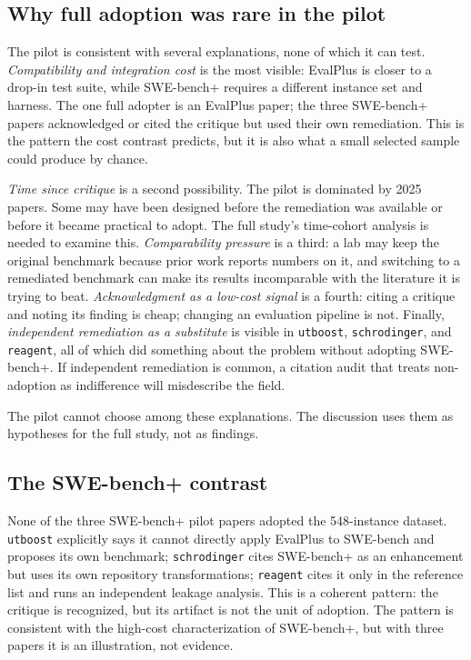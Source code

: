 \documentclass[11pt,a4paper]{article}
\newcommand{\key}[1]{\texttt{\small #1}}
\begin{document}
\subsection{Why full adoption was rare in the pilot}

The pilot is consistent with several explanations, none of which it can test. \emph{Compatibility and integration cost} is the most visible: EvalPlus is closer to a drop-in test suite, while SWE-bench+ requires a different instance set and harness. The one full adopter is an EvalPlus paper; the three SWE-bench+ papers acknowledged or cited the critique but used their own remediation. This is the pattern the cost contrast predicts, but it is also what a small selected sample could produce by chance.

\emph{Time since critique} is a second possibility. The pilot is dominated by 2025 papers. Some may have been designed before the remediation was available or before it became practical to adopt. The full study's time-cohort analysis is needed to examine this. \emph{Comparability pressure} is a third: a lab may keep the original benchmark because prior work reports numbers on it, and switching to a remediated benchmark can make its results incomparable with the literature it is trying to beat. \emph{Acknowledgment as a low-cost signal} is a fourth: citing a critique and noting its finding is cheap; changing an evaluation pipeline is not. Finally, \emph{independent remediation as a substitute} is visible in \key{utboost}, \key{schrodinger}, and \key{reagent}, all of which did something about the problem without adopting SWE-bench+. If independent remediation is common, a citation audit that treats non-adoption as indifference will misdescribe the field.

The pilot cannot choose among these explanations. The discussion uses them as hypotheses for the full study, not as findings.

\subsection{The SWE-bench+ contrast}

None of the three SWE-bench+ pilot papers adopted the 548-instance dataset. \key{utboost} explicitly says it cannot directly apply EvalPlus to SWE-bench and proposes its own benchmark; \key{schrodinger} cites SWE-bench+ as an enhancement but uses its own repository transformations; \key{reagent} cites it only in the reference list and runs an independent leakage analysis. This is a coherent pattern: the critique is recognized, but its artifact is not the unit of adoption. The pattern is consistent with the high-cost characterization of SWE-bench+, but with three papers it is an illustration, not evidence.
\end{document}
